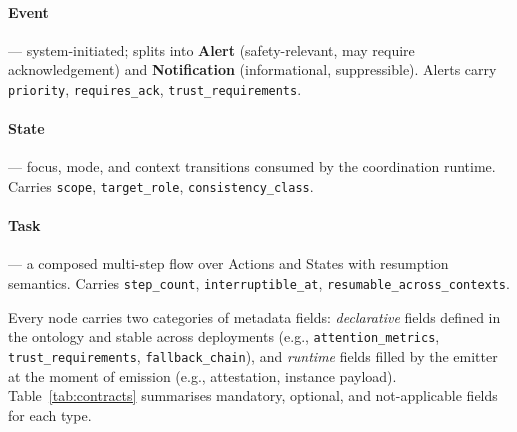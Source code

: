 \documentclass[manuscript,screen,review,anonymous]{acmart}
\begin{document}
\paragraph{Event} --- system-initiated; splits into \textbf{Alert}
(safety-relevant, may require acknowledgement) and \textbf{Notification}
(informational, suppressible). Alerts carry \texttt{priority},
\texttt{requires\_ack}, \texttt{trust\_requirements}.

\paragraph{State} --- focus, mode, and context transitions consumed by the
coordination runtime. Carries \texttt{scope}, \texttt{target\_role},
\texttt{consistency\_class}.

\paragraph{Task} --- a composed multi-step flow over Actions and States with
resumption semantics. Carries \texttt{step\_count},
\texttt{interruptible\_at}, \texttt{resumable\_across\_contexts}.

Every node carries two categories of metadata fields: \emph{declarative}
fields defined in the ontology and stable across deployments (e.g.,
\texttt{attention\_metrics}, \texttt{trust\_requirements},
\texttt{fallback\_chain}), and \emph{runtime} fields filled by the emitter at
the moment of emission (e.g., attestation, instance payload).
Table~\ref{tab:contracts} summarises mandatory, optional, and not-applicable
fields for each type.
\end{document}
